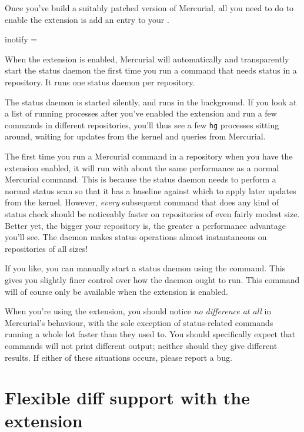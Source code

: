 Once you've build a suitably patched version of Mercurial, all you
need to do to enable the  extension is add an entry to
your \hgrc.
\begin{codesample2}
  [extensions]
  inotify =
\end{codesample2}
When the  extension is enabled, Mercurial will
automatically and transparently start the status daemon the first time
you run a command that needs status in a repository.  It runs one
status daemon per repository.

The status daemon is started silently, and runs in the background.  If
you look at a list of running processes after you've enabled the
 extension and run a few commands in different
repositories, you'll thus see a few \texttt{hg} processes sitting
around, waiting for updates from the kernel and queries from
Mercurial.

The first time you run a Mercurial command in a repository when you
have the  extension enabled, it will run with about the
same performance as a normal Mercurial command.  This is because the
status daemon needs to perform a normal status scan so that it has a
baseline against which to apply later updates from the kernel.
However, \emph{every} subsequent command that does any kind of status
check should be noticeably faster on repositories of even fairly
modest size.  Better yet, the bigger your repository is, the greater a
performance advantage you'll see.  The  daemon makes
status operations almost instantaneous on repositories of all sizes!

If you like, you can manually start a status daemon using the
 command.  This gives you slightly finer
control over how the daemon ought to run.  This command will of course
only be available when the  extension is enabled.

When you're using the  extension, you should notice
\emph{no difference at all} in Mercurial's behaviour, with the sole
exception of status-related commands running a whole lot faster than
they used to.  You should specifically expect that commands will not
print different output; neither should they give different results.
If either of these situations occurs, please report a bug.

\section{Flexible diff support with the  extension}
\label{sec:hgext:extdiff}

